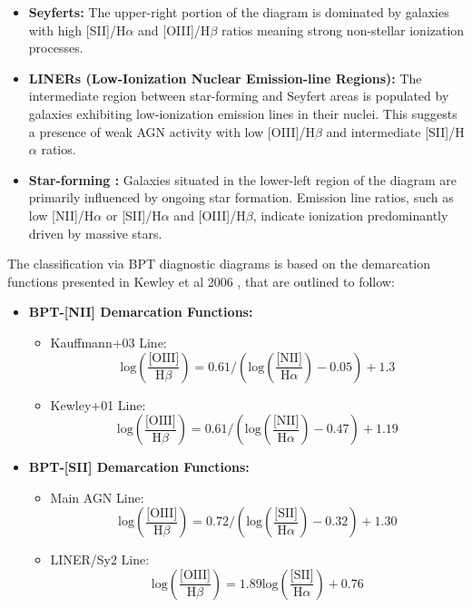 		\begin{itemize}
    		\item \textbf{Seyferts:} The upper-right portion of the diagram is dominated by galaxies with high [SII]/H$\alpha$ and [OIII]/H$\beta$ ratios meaning strong non-stellar ionization processes.
    		\item \textbf{LINERs (Low-Ionization Nuclear Emission-line Regions):} The intermediate region between star-forming and Seyfert areas is populated by galaxies exhibiting low-ionization emission lines in their nuclei. This suggests a presence of weak AGN activity with low [OIII]/H$\beta$ and intermediate [SII]/H$\alpha$ ratios.
		 \item \textbf{Star-forming :} Galaxies situated in the lower-left region of the diagram are primarily influenced by ongoing star formation. Emission line ratios, such as low [NII]/H$\alpha$ or [SII]/H$\alpha$ and [OIII]/H$\beta$, indicate ionization predominantly driven by massive stars.
		\end{itemize}


The classification via BPT diagnostic diagrams is based on the demarcation functions presented in Kewley et al 2006 \cite{2006MNRAS.372..961K}, that are outlined to follow:
\begin{itemize}
    \item \textbf{BPT-[NII] Demarcation Functions:}
    \begin{itemize}
        \item Kauffmann+03 Line: \[ \text{log}(\frac{\text{[OIII]}}{\text{H}\beta}) = 0.61 / (\text{log}(\frac{\text{[NII]}}{\text{H}\alpha}) - 0.05) + 1.3 \]
        \item Kewley+01 Line: \[ \text{log}(\frac{\text{[OIII]}}{\text{H}\beta}) = 0.61 / (\text{log}(\frac{\text{[NII]}}{\text{H}\alpha}) - 0.47) + 1.19 \]
    \end{itemize}

    \item \textbf{BPT-[SII] Demarcation Functions:}
    \begin{itemize}
        \item Main AGN Line: \[ \text{log}(\frac{\text{[OIII]}}{\text{H}\beta}) = 0.72 / (\text{log}(\frac{\text{[SII]}}{\text{H}\alpha}) - 0.32) + 1.30 \]
        \item LINER/Sy2 Line: \[ \text{log}(\frac{\text{[OIII]}}{\text{H}\beta}) = 1.89 \text{log}(\frac{\text{[SII]}}{\text{H}\alpha}) + 0.76 \]
    \end{itemize}
\end{itemize}

